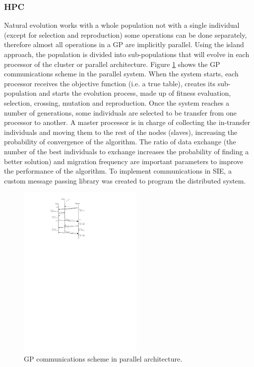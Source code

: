 \documentclass[runningheads,a4paper]{llncs}
\begin{document}
\subsubsection{HPC}
Natural evolution works with a whole population not with a single individual (except for selection and reproduction) some operations can be done separately, therefore almost all operations in a GP are implicitly parallel. Using the island approach, the population is divided into sub-populations that will evolve in each processor of the cluster or parallel architecture. Figure \ref{fig:communications} shows the GP communications scheme in the parallel system. When the system starts, each processor receives the objective function (i.e. a true table), creates its sub-population and starts the evolution process, made up of fitness evaluation, selection, crossing, mutation and reproduction. Once the system reaches a number of generations, some individuals are selected to be transfer from one processor to another. A master processor is in charge of collecting the in-transfer individuals and moving them to the rest of the nodes (slaves), increasing the probability of convergence of the algorithm. The ratio of data exchange (the number of the best individuals to exchange increases the probability of finding a better solution) and migration frequency are important parameters to improve the performance of the algorithm. To implement communications in SIE, a custom message passing library was created to program the distributed system.

\begin{figure}[htpb]
\begin{center} 
\includegraphics[width=6cm]{./images/communications} \end{center}
\caption{GP communications scheme in parallel architecture.}\label{fig:communications}
\end{figure}
\end{document}
